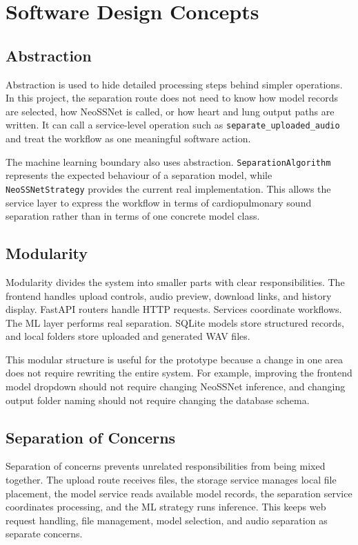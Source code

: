 \section{Software Design Concepts}

\subsection{Abstraction}

Abstraction is used to hide detailed processing steps behind simpler operations. In this project, the separation route does not need to know how model records are selected, how NeoSSNet is called, or how heart and lung output paths are written. It can call a service-level operation such as \texttt{separate\_uploaded\_audio} and treat the workflow as one meaningful software action.

The machine learning boundary also uses abstraction. \texttt{SeparationAlgorithm} represents the expected behaviour of a separation model, while \texttt{NeoSSNetStrategy} provides the current real implementation. This allows the service layer to express the workflow in terms of cardiopulmonary sound separation rather than in terms of one concrete model class.

\subsection{Modularity}

Modularity divides the system into smaller parts with clear responsibilities. The frontend handles upload controls, audio preview, download links, and history display. FastAPI routers handle HTTP requests. Services coordinate workflows. The ML layer performs real separation. SQLite models store structured records, and local folders store uploaded and generated WAV files.

This modular structure is useful for the prototype because a change in one area does not require rewriting the entire system. For example, improving the frontend model dropdown should not require changing NeoSSNet inference, and changing output folder naming should not require changing the database schema.

\subsection{Separation of Concerns}

Separation of concerns prevents unrelated responsibilities from being mixed together. The upload route receives files, the storage service manages local file placement, the model service reads available model records, the separation service coordinates processing, and the ML strategy runs inference. This keeps web request handling, file management, model selection, and audio separation as separate concerns.

